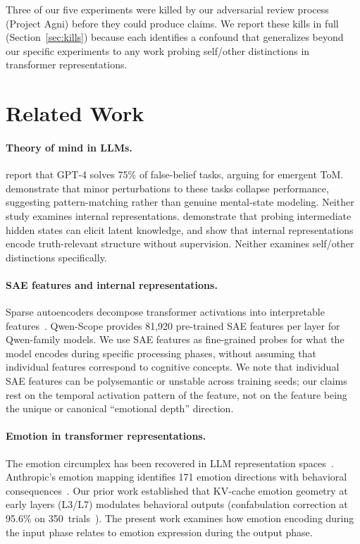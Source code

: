 \documentclass[11pt,a4paper]{article}
\begin{document}
Three of our five experiments were killed by our adversarial review process
(Project Agni) before they could produce claims. We report these kills in
full (Section~\ref{sec:kills}) because each identifies a confound that
generalizes beyond our specific experiments to any work probing self/other
distinctions in transformer representations.

\section{Related Work}
\label{sec:related}

\paragraph{Theory of mind in LLMs.}
\citet{kosinski2024evaluating} report that GPT-4 solves 75\% of false-belief
tasks, arguing for emergent ToM. \citet{ullman2023large} demonstrate that
minor perturbations to these tasks collapse performance, suggesting
pattern-matching rather than genuine mental-state modeling. Neither study
examines internal representations. \citet{li2024inference} demonstrate that probing intermediate hidden states
can elicit latent knowledge, and \citet{burns2023discovering} show that
internal representations encode truth-relevant structure without
supervision. Neither examines self/other distinctions specifically.

\paragraph{SAE features and internal representations.}
Sparse autoencoders decompose transformer activations into interpretable
features~\citep{bricken2023monosemanticity, cunningham2023sparse,
templeton2024scaling}. Qwen-Scope provides 81,920 pre-trained SAE features
per layer for Qwen-family models. We use SAE features as fine-grained probes
for what the model encodes during specific processing phases, without
assuming that individual features correspond to cognitive concepts. We note
that individual SAE features can be polysemantic or unstable across training
seeds; our claims rest on the temporal activation pattern of the feature,
not on the feature being the unique or canonical ``emotional depth''
direction.

\paragraph{Emotion in transformer representations.}
The emotion circumplex has been recovered in LLM representation
spaces~\citep{sun2026circumplex}. Anthropic's emotion
mapping identifies 171 emotion directions with behavioral
consequences~\citep{anthropic2026emotion}. Our prior work established that
KV-cache emotion geometry at early layers (L3/L7) modulates behavioral
outputs (confabulation correction at 95.6\% on 350~trials~\citep{lyra2026oracle}). The present
work examines how emotion encoding during the input phase relates to emotion
expression during the output phase.
\end{document}
